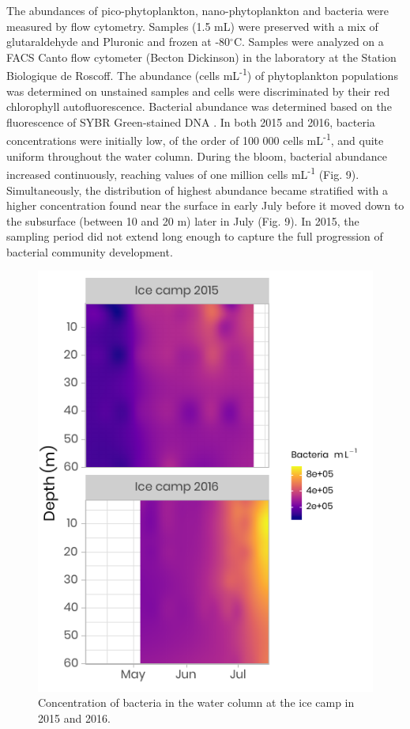 \documentclass[essd, manuscript]{copernicus}
\begin{document}
The abundances of pico-phytoplankton, nano-phytoplankton and bacteria were measured by flow cytometry. Samples (1.5 mL) were preserved with a mix of glutaraldehyde and Pluronic \citep{Marie2014} and frozen at -80$^{\circ}$C. Samples were analyzed on a FACS Canto flow cytometer (Becton Dickinson) in the laboratory at the Station Biologique de Roscoff. The abundance (cells mL\textsuperscript{-1}) of phytoplankton populations was determined on unstained samples and cells were discriminated by their red chlorophyll autofluorescence. Bacterial abundance was determined based on the fluorescence of SYBR Green-stained DNA \citep{Marie1997}. In both 2015 and 2016, bacteria concentrations were initially low, of the order of 100 000 cells mL\textsuperscript{-1}, and quite uniform throughout the water column. During the bloom, bacterial abundance increased continuously,  reaching values of one million cells mL\textsuperscript{-1} (Fig. 9). Simultaneously, the distribution of highest abundance became stratified with a higher concentration found near the surface in early July before it moved down to the subsurface (between 10 and 20 m) later in July (Fig. 9). In 2015, the sampling period did not extend long enough to capture the full progression of bacterial community development.

\begin{figure}[H]
	\centering
	\includegraphics[scale = 1]{../../../graphs/fig09.pdf}
	\caption{Concentration of bacteria in the water column at the ice camp in 2015 and 2016.}
\end{figure}
\end{document}

